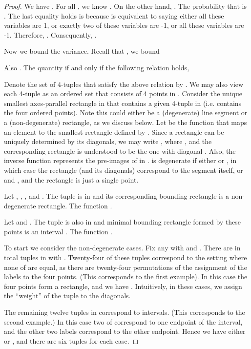 \def\draft{0}  \documentclass[proceedings]{stacs}
\theoremstyle{plain}\newtheorem{satz}[thm]{Satz}
\theoremstyle{definition}\newtheorem{crucial}[thm]{Crucial Definition}
\begin{document}
\begin{proof}
We have .  For all
, we know . On the other
hand, .  The probability
that  is . The last equality holds is because
 is equivalent to saying either all
these variables are 1, or exactly two of these variables are -1, or all
these variables are -1. Therefore, . Consequently, .

Now we bound the variance. Recall that , we bound


Also . The quantity
 if and only if the following relation holds,

Denote the set of 4-tuples  that satisfy the above relation by .
We may also view each 4-tuple as an ordered set that consists of 4 points in .
Consider the unique smallest axes-parallel rectangle in 
that contains a given 4-tuple in  (i.e. contains the
four ordered points).  Note this could either be a (degenerate) line segment
or a (non-degenerate) rectangle, as we discuss below.
Let  be the function
that maps an element  to the smallest rectangle
 defined by . Since a
rectangle can be uniquely determined by its diagonals, we may write
,
where , 
and the corresponding rectangle is understood to be the one with
diagonal . Also, the
inverse function 
represents the pre-images of 
in .  is degenerate if either  or , in which case the rectangle (and
its diagonals) correspond to the segment itself, or  and , and the rectangle is just a
single point.


\begin{example}
Let , ,
, and . The tuple is in  and its corresponding bounding rectangle is
a non-degenerate rectangle. The function .
\end{example}

\begin{example} Let 
and . The tuple is also in  and
minimal bounding rectangle formed by these points is an interval . The function
.
\end{example}

To start we consider the non-degenerate cases.
Fix any  with  and .
There are in total  tuples  in  with .  Twenty-four of these tuples
correspond to the setting where none of  are equal, as there
are twenty-four permutations of the assignment of the labels  to the four points. (This corresponds to the first example).  In this
case the four points form a rectangle, and we have
.
Intuitively, in these cases, we assign the ``weight'' of the tuple to the diagonals.

The remaining twelve tuples in  correspond to intervals. (This corresponds to the second example.)
In this case two of  correspond to one endpoint of the interval, and the other two labels
correspond to the other endpoint.
Hence we have either  or , and there are six tuples for each case.


\end{proof}
\end{document}
